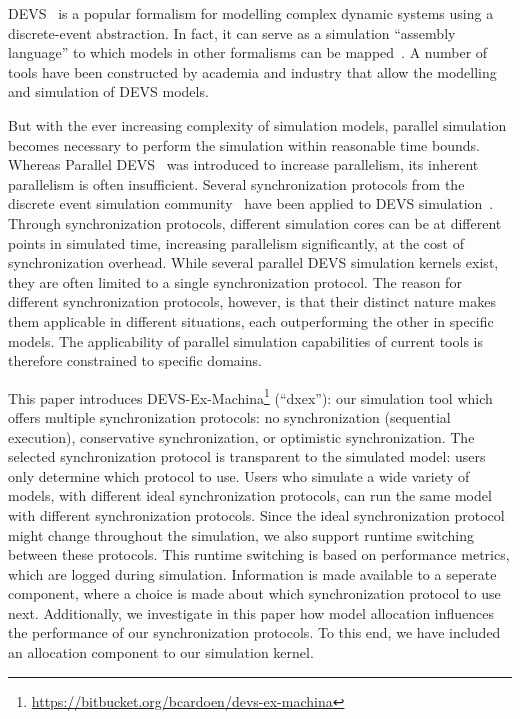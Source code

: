 \textsf{DEVS}~\cite{ClassicDEVS} is a popular formalism for modelling complex dynamic systems using a discrete-event abstraction.
In fact, it can serve as a simulation ``assembly language'' to which models in other formalisms can be mapped~\cite{DEVSbase}.
A number of tools have been constructed by academia and industry that allow the modelling and simulation of \textsf{DEVS} models.

But with the ever increasing complexity of simulation models, parallel simulation becomes necessary to perform the simulation within reasonable time bounds.
Whereas \textsf{Parallel DEVS}~\cite{ParallelDEVS} was introduced to increase parallelism, its inherent parallelism is often insufficient.
Several synchronization protocols from the discrete event simulation community~\cite{FujimotoBook} have been applied to \textsf{DEVS} simulation~\cite{globaltimewarp}.
Through synchronization protocols, different simulation cores can be at different points in simulated time, increasing parallelism significantly, at the cost of synchronization overhead.
While several parallel \textsf{DEVS} simulation kernels exist, they are often limited to a single synchronization protocol.
The reason for different synchronization protocols, however, is that their distinct nature makes them applicable in different situations, each outperforming the other in specific models.
The applicability of parallel simulation capabilities of current tools is therefore constrained to specific domains.

This paper introduces DEVS-Ex-Machina\footnote{\url{https://bitbucket.org/bcardoen/devs-ex-machina}} (``dxex''): our simulation tool which offers multiple synchronization protocols: no synchronization (sequential execution), conservative synchronization, or optimistic synchronization.
The selected synchronization protocol is transparent to the simulated model: users only determine which protocol to use.
Users who simulate a wide variety of models, with different ideal synchronization protocols, can run the same model with different synchronization protocols.
Since the ideal synchronization protocol might change throughout the simulation, we also support runtime switching between these protocols.
This runtime switching is based on performance metrics, which are logged during simulation.
Information is made available to a seperate component, where a choice is made about which synchronization protocol to use next.
Additionally, we investigate in this paper how model allocation influences the performance of our synchronization protocols.
To this end, we have included an allocation component to our simulation kernel.

